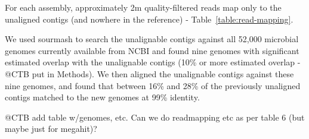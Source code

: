 \documentclass[10pt,a4paper,twocolumn]{article}
\begin{document}
For
each assembly, approximately 2m quality-filtered reads map only to the
unaligned contigs (and nowhere in the reference) - Table~\ref{table:read-mapping}.





We used sourmash \cite{sourmash} to search the unalignable contigs against all
52,000 microbial genomes currently available from NCBI and found nine
genomes with significant estimated overlap with the unalignable contigs
(10\% or more estimated overlap - @CTB put in Methods).  We then
aligned the unalignable contigs against these nine genomes, and found
that between 16\% and 28\% of the previously unaligned contigs matched
to the new genomes at 99\% identity.

@CTB add table w/genomes, etc. Can we do readmapping etc as per table 6
(but maybe just for megahit)?

\end{document}
